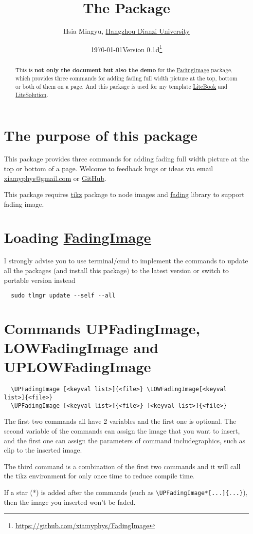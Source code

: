 \documentclass[11pt]{article}
\title{\bfseries The \pkg{FadingImage} Package}
\author{Hsia Mingyu, \href{https://www.hdu.edu.cn}{Hangzhou Dianzi University}}
\affil{\href{mailto:xiamyphys@gmail.com}{\ttfamily xiamyphys@gmail.com}}
\date{\today\quad Version 0.1d\thanks{\url{https://github.com/xiamyphys/FadingImage}}}
\def\pkg#1{\texorpdfstring{\textcolor{pkgcolor}{
    \href{https://ctan.org/pkg/#1}{\textsf{#1}}}}{“#1”}}
\def\cmd#1{\texorpdfstring{\textcolor{cmdcolor}{\textsf{#1}}}{“#1”}}
\begin{document}
\maketitle
{}

\vspace{-6ex}
\begin{abstract}
This is \textsf{\textbf{not only the document but also the demo}} for the \pkg{FadingImage} package, which provides three commands for adding fading full width picture at the top, bottom or both of them on a page. And this package is used for my template \pkg{LiteBook} and \pkg{LiteSolution}.
\end{abstract}

\section{The purpose of this package}
This package provides three commands for adding fading full width picture at the top or bottom of a page. Welcome to feedback bugs or ideas via email \href{mailto:xiamyphys@gmail.com}{\ttfamily xiamyphys@gmail.com} or \href{https://github.com/xiamyphys/fadingimage}{GitHub}.

This package requires \pkg{tikz} package to node images and \pkg{fading} library to support fading image.

\section{Loading \pkg{FadingImage}}
I strongly advise you to use terminal/cmd to implement the commands to update all the packages (and install this package) to the latest version or switch to portable version instead
\begin{verbatim}
  sudo tlmgr update --self --all
\end{verbatim}

\section{Commands \cmd{UPFadingImage}, \cmd{LOWFadingImage} and \cmd{UPLOWFadingImage}}
\begin{small}
\begin{verbatim}
  \UPFadingImage [<keyval list>]{<file>} \LOWFadingImage[<keyval list>]{<file>}
  \UPFadingImage [<keyval list>]{<file>} [<keyval list>]{<file>}
\end{verbatim}
\end{small}

The first two commands all have 2 variables and the first one is optional. The second variable of the commands can assign the image that you want to insert, and the first one can assign the parameters of command \cmd{includegraphics}, such as clip to the inserted image.

The third command is a combination of the first two commands and it will call the \cmd{tikz} environment for only once time to reduce compile time.

If a star (*) is added after the commands (such as \verb|\UPFadingImage*[...]{...}|), then the image you inserted won't be faded.
\end{document}
